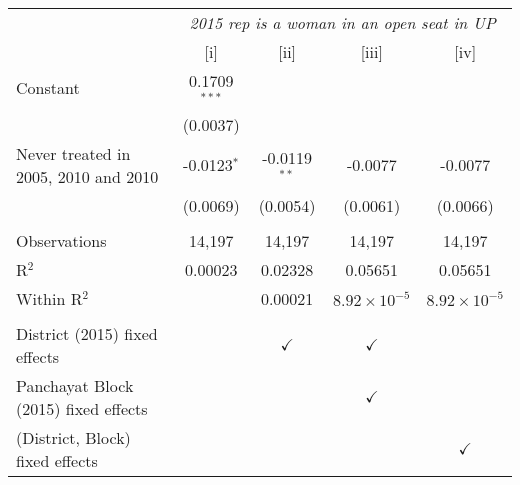 
\begingroup
\centering
\begin{tabular}{lcccc}
   \toprule
    & \multicolumn{4}{c}{\textit{2015 rep is a woman in an open seat in UP}}\\
                                        & [i]            & [ii]           & [iii]                 & [iv]\\  
   \midrule 
   Constant                             & 0.1709$^{***}$ &                &                       &   \\   
                                        & (0.0037)       &                &                       &   \\   
   Never treated in 2005, 2010 and 2010 & -0.0123$^{*}$  & -0.0119$^{**}$ & -0.0077               & -0.0077\\   
                                        & (0.0069)       & (0.0054)       & (0.0061)              & (0.0066)\\   
    \\
   Observations                         & 14,197         & 14,197         & 14,197                & 14,197\\  
   R$^2$                                & 0.00023        & 0.02328        & 0.05651               & 0.05651\\  
   Within R$^2$                         &                & 0.00021        & $8.92\times 10^{-5}$  & $8.92\times 10^{-5}$\\   
    \\
   District (2015) fixed effects        &                & $\checkmark$   & $\checkmark$          & \\  
   Panchayat Block (2015) fixed effects &                &                & $\checkmark$          & \\  
   (District, Block) fixed effects      &                &                &                       & $\checkmark$\\   
   \bottomrule
\end{tabular}
\par\endgroup


